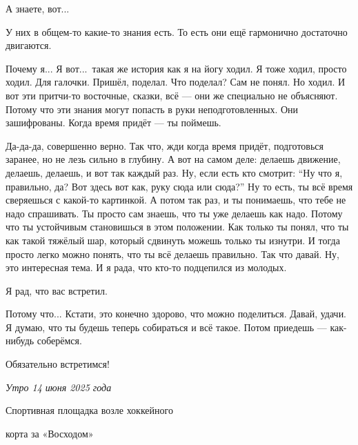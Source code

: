 \I
А знаете, вот...

\M
У них в общем-то какие-то знания есть. То есть они ещё гармонично достаточно двигаются.

\I
Почему я... Я вот...\
такая же история как я на йогу ходил.
Я тоже ходил, просто ходил.
Для галочки.
Пришёл, поделал. Что поделал? Сам не понял.
Но ходил.
И вот эти притчи-то восточные, сказки, всё --- они же специально не объясняют.
Потому что эти знания могут попасть в руки неподготовленных.
Они зашифрованы.
Когда время придёт --- ты поймешь.

\M
Да-да-да, совершенно верно.
Так что, жди когда время придёт, подготовься заранее, но не лезь сильно в глубину.
А вот на самом деле: делаешь движение, делаешь, делаешь, и вот так каждый раз.
Ну, если есть кто смотрит: ``Ну что я, правильно, да? Вот здесь вот как, руку сюда или сюда?''
Ну то есть, ты всё время сверяешься с какой-то картинкой.
А потом так раз, и ты понимаешь, что тебе не надо спрашивать.
Ты просто сам знаешь, что ты уже делаешь как надо.
Потому что ты устойчивым становишься в этом положении.
Как только ты понял, что ты как такой тяжёлый шар, который сдвинуть можешь только ты изнутри.
И тогда просто легко можно понять, что ты всё делаешь правильно. Так что давай.
Ну, это интересная тема.
И я рада, что кто-то подцепился из молодых.

\I
Я рад, что вас встретил.

\M
Потому что... Кстати, это конечно здорово, что можно
поделиться. Давай, удачи. Я думаю, что ты будешь теперь собираться и всё такое.
Потом приедешь --- как-нибудь соберёмся.

\I
Обязательно встретимся!

\kern2cm
\it
\lineskip=7pt
\hskip6cm Утро 14 июня 2025 года \par
\hskip4cm Спортивная площадка возле хоккейного \par
\hskip7.5cm корта за «Восходом» \par
\bye

